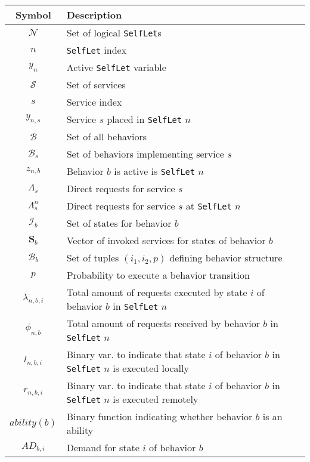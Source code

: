 \documentclass[11pt]{amsart}
\newcommand{\slet}{\texttt{SelfLet}}
\newcommand{\moreslet}{\texttt{SelfLet}s}
\begin{document}
\begin{table}[htbp]

\begin{center}
\renewcommand\arraystretch{1.4}%

\begin{tabular}{|c|p{12cm}|}
\hline \textbf{Symbol} & \textbf{Description} \\ \hline
$\mathcal{N}$ & Set of logical \moreslet{}\\ \hline
$n$ & \slet{} index \\ \hline
$y_n$ & Active \slet{} variable \\ \hline
$\mathcal{S}$ & Set of services \\ \hline
$s$ & Service index \\ \hline
$y_{n,s}$ & Service $s$ placed in \slet{} $n$ \\ \hline
$\mathcal{B}$ & Set of all behaviors \\ \hline
$\mathcal{B}_s$ & Set of behaviors implementing service $s$ \\ \hline
$z_{n,b}$ & Behavior $b$ is active is \slet{} $n$ \\ \hline
$\Lambda_s$ & Direct requests for service $s$ \\ \hline
$\Lambda_s^n$ & Direct requests for service $s$ at \slet{} $n$\\ \hline
$\mathcal{I}_b$ & Set of states for behavior $b$ \\ \hline
$\mathbf{S}_b$ & Vector of invoked services for states of behavior $b$ \\ \hline
$\mathcal{B}_b$ & Set of tuples $(i_1,i_2,p)$ defining behavior structure \\ \hline
$p$ & Probability to execute a behavior transition \\ \hline
$\lambda_{n,b,i}$ & Total amount of requests executed by state $i$ of behavior $b$ in \slet{} $n$ \\ \hline
$\phi_{n,b}$ & Total amount of requests received by behavior $b$ in \slet{} $n$ \\ \hline
$l_{n, b, i}$ & Binary var. to indicate that state $i$ of behavior $b$ in \slet{} $n$ is executed locally \\ \hline
$r_{n, b, i}$ & Binary var. to indicate that state $i$ of behavior $b$ in \slet{} $n$ is executed remotely \\ \hline
$ability(b)$ & Binary function indicating whether behavior $b$ is an ability \\ \hline
$AD_{b,i}$ & Demand for state $i$ of behavior $b$ \\ \hline

\end{tabular}
\end{center}
\end{table}
\end{document}

